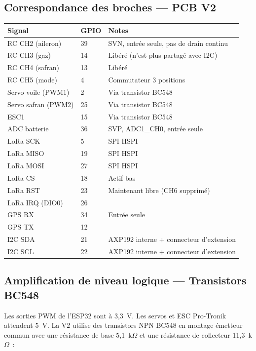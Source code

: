 \documentclass[12pt,a4paper]{article}
\begin{document}
\subsection{Correspondance des broches — PCB V2}

\begin{longtable}{C{2.5cm} C{2cm} L{7cm}}
  \toprule
  \textcolor{tableheadfg}{\textbf{Signal}} &
  \textcolor{tableheadfg}{\textbf{GPIO}} &
  \textcolor{tableheadfg}{\textbf{Notes}} \\
  \midrule
  \endhead
  \bottomrule
  \endfoot
  RC CH2 (aileron) & 39 & SVN, entrée seule, pas de drain continu \\[3pt]
  RC CH3 (gaz) & 14 & Libéré (n'est plus partagé avec I2C) \\[3pt]
  RC CH4 (safran) & 13 & Libéré \\[3pt]
  RC CH5 (mode) & 4 & Commutateur 3 positions \\[3pt]
  Servo voile (PWM1) & 2 & Via transistor BC548 \\[3pt]
  Servo safran (PWM2) & 25 & Via transistor BC548 \\[3pt]
  ESC1 & 15 & Via transistor BC548 \\[3pt]
  ADC batterie & 36 & SVP, ADC1\_CH0, entrée seule \\[3pt]
  LoRa SCK & 5 & SPI HSPI \\[3pt]
  LoRa MISO & 19 & SPI HSPI \\[3pt]
  LoRa MOSI & 27 & SPI HSPI \\[3pt]
  LoRa CS & 18 & Actif bas \\[3pt]
  LoRa RST & 23 & Maintenant libre (CH6 supprimé) \\[3pt]
  LoRa IRQ (DIO0) & 26 & \\[3pt]
  GPS RX & 34 & Entrée seule \\[3pt]
  GPS TX & 12 & \\[3pt]
  I2C SDA & 21 & AXP192 interne + connecteur d'extension \\[3pt]
  I2C SCL & 22 & AXP192 interne + connecteur d'extension \\
\end{longtable}

\subsection{Amplification de niveau logique — Transistors BC548}

Les sorties PWM de l'ESP32 sont à 3,3~V. Les servos et ESC Pro-Tronik
attendent 5~V. La V2 utilise des transistors NPN BC548 en montage émetteur
commun avec une résistance de base 5,1~k$\Omega$ et une résistance de
collecteur 11,3~k$\Omega$~:
\end{document}
